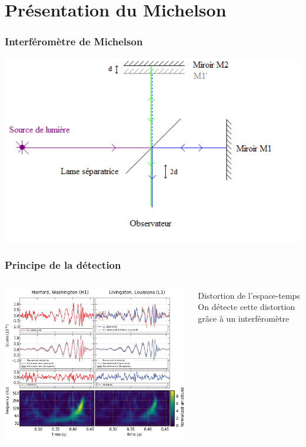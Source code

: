 \documentclass{beamer}
\begin{document}
\section{Présentation du Michelson}
\begin{frame}
	\frametitle{Interféromètre de Michelson}
	\includegraphics[scale=0.5]{Docs/interferometre_michelson.png}
\end{frame}


\begin{frame}
	\frametitle{Principe de la détection}
	\begin{columns}
		\begin{column}{0.5\textwidth}
			\includegraphics[width=\textwidth]{Docs/detection.png}		
		\end{column}
		\begin{column}{0.5\textwidth}
			Distortion de l'espace-temps
			\\
			On détecte cette distortion grâce à un interféromètre
		\end{column}
	\end{columns}
\end{frame}
\end{document}
